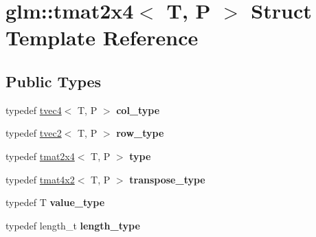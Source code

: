 \hypertarget{structglm_1_1tmat2x4}{\section{glm\-:\-:tmat2x4$<$ T, P $>$ Struct Template Reference}
\label{structglm_1_1tmat2x4}
}
\subsection*{Public Types}
\begin{DoxyCompactItemize}
\item 
\hypertarget{structglm_1_1tmat2x4_a9effcccd2c4c50c385e4c3a2fe2feedb}{typedef \hyperlink{structglm_1_1tvec4}{tvec4}$<$ T, P $>$ {\bfseries col\-\_\-type}}\label{structglm_1_1tmat2x4_a9effcccd2c4c50c385e4c3a2fe2feedb}

\item 
\hypertarget{structglm_1_1tmat2x4_a3c55d4a9be73c34967ab6f5010d8ae70}{typedef \hyperlink{structglm_1_1tvec2}{tvec2}$<$ T, P $>$ {\bfseries row\-\_\-type}}\label{structglm_1_1tmat2x4_a3c55d4a9be73c34967ab6f5010d8ae70}

\item 
\hypertarget{structglm_1_1tmat2x4_a37444455c9e8f7e00973c990eec0ff21}{typedef \hyperlink{structglm_1_1tmat2x4}{tmat2x4}$<$ T, P $>$ {\bfseries type}}\label{structglm_1_1tmat2x4_a37444455c9e8f7e00973c990eec0ff21}

\item 
\hypertarget{structglm_1_1tmat2x4_a00436dc5f11ba5e0bda1286402ded8be}{typedef \hyperlink{structglm_1_1tmat4x2}{tmat4x2}$<$ T, P $>$ {\bfseries transpose\-\_\-type}}\label{structglm_1_1tmat2x4_a00436dc5f11ba5e0bda1286402ded8be}

\item 
\hypertarget{structglm_1_1tmat2x4_a3d43dfa1bcb8be0ad095350ee71b972e}{typedef T {\bfseries value\-\_\-type}}\label{structglm_1_1tmat2x4_a3d43dfa1bcb8be0ad095350ee71b972e}

\item 
\hypertarget{structglm_1_1tmat2x4_a8d8156b982138c22047082ca7a8f9009}{typedef length\-\_\-t {\bfseries length\-\_\-type}}\label{structglm_1_1tmat2x4_a8d8156b982138c22047082ca7a8f9009}

\end{DoxyCompactItemize}
